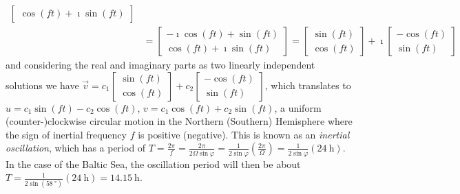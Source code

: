 \begin{solution}
\begin{align*}
\begin{bmatrix}
\cos(ft) + \imath \sin(ft)
\end{bmatrix} \\
&= \begin{bmatrix}
-\imath \cos(ft) + \sin(ft) \\
\cos(ft) + \imath \sin(ft)
\end{bmatrix} = 
\begin{bmatrix}
\sin(ft) \\
\cos(ft) 
\end{bmatrix}
+\imath 
\begin{bmatrix}
-\cos(ft) \\
\sin(ft) 
\end{bmatrix}
\end{align*}
and considering the real and imaginary parts as two linearly independent solutions we have $\vec{v} = c_1\begin{bmatrix}
\sin(ft) \\
\cos(ft) 
\end{bmatrix} + c_2\begin{bmatrix}
-\cos(ft) \\
\sin(ft) 
\end{bmatrix}$, which translates to $u = c_1\sin(ft) - c_2\cos(ft)$, $v = c_1\cos(ft) + c_2\sin(ft)$, a uniform (counter-)clockwise circular motion in the Northern (Southern) Hemisphere where the sign of inertial frequency $f$ is positive (negative). This is known as an \textit{inertial oscillation}, which has a period of $T = \frac{2\pi}{f} = \frac{2\pi}{2\Omega \sin \varphi} = \frac{1}{2 \sin \varphi}(\frac{2\pi}{\Omega}) = \frac{1}{2 \sin \varphi}(\SI{24}{\hour})$. In the case of the Baltic Sea, the oscillation period will then be about $T = \frac{1}{2 \sin(\SI{58}{\degree})}(\SI{24}{\hour}) = \SI{14.15}{\hour}$.
\end{solution}

